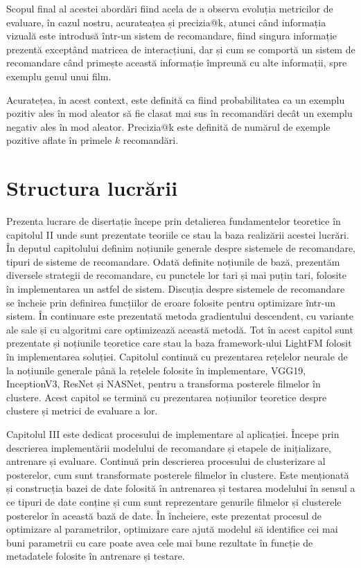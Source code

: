 Scopul final al acestei abordări fiind acela de a observa evoluția metricilor de evaluare, în cazul nostru, acurateațea și precizia@k, atunci când informația vizuală este introdusă într-un sistem de recomandare, fiind singura informație prezentă exceptând matricea de interacțiuni, dar și cum se comportă un sistem de recomandare când primește această informație împreună cu alte informații, spre exemplu genul unui film.

Acuratețea, în acest context, este definită ca fiind probabilitatea ca un exemplu pozitiv ales în mod aleator să fie clasat mai sus în recomandări decât un exemplu negativ ales în mod aleator. Precizia@k este definită de numărul de exemple pozitive aflate în primele $k$ recomandări.

\section{Structura lucrării}
Prezenta lucrare de disertație începe prin detalierea fundamentelor teoretice în capitolul II unde sunt prezentate teoriile ce stau la baza realizării acestei lucrări. În deputul capitolului definim noțiunile generale despre sistemele de recomandare, tipuri de sisteme de recomandare. Odată definite noțiunile de bază, prezentăm diversele strategii de recomandare, cu punctele lor tari și mai puțin tari, folosite în implementarea un astfel de sistem. Discuția despre sistemele de recomandare se încheie prin definirea funcțiilor de eroare folosite pentru optimizare într-un sistem. În continuare este prezentată metoda gradientului descendent, cu variante ale sale și cu algoritmi care optimizează această metodă. Tot în acest capitol sunt prezentate și noțiunile teoretice care stau la baza framework-ului LightFM folosit în implementarea soluției. Capitolul continuă cu prezentarea rețelelor neurale de la noțiunile generale până la rețelele folosite în implementare, VGG19, InceptionV3, ResNet și NASNet, pentru a transforma posterele filmelor în clustere. Acest capitol se termină cu prezentarea noțiunilor teoretice despre clustere și metrici de evaluare a lor.

Capitolul III este dedicat procesului de implementare al aplicației. Începe prin descrierea implementării modelului de recomandare și etapele de inițializare, antrenare și evaluare. Continuă prin descrierea procesului de clusterizare al posterelor, cum sunt transformate posterele filmelor în clustere. Este menționată și construcția bazei de date folosită în antrenarea și testarea modelului în sensul a ce tipuri de date conține și cum sunt reprezentare genurile filmelor și clusterele posterelor în această bază de date. În încheiere, este prezentat procesul de optimizare al parametrilor, optimizare care ajută modelul să identifice cei mai buni parametrii cu care poate avea cele mai bune rezultate în funcție de metadatele folosite în antrenare și testare.

